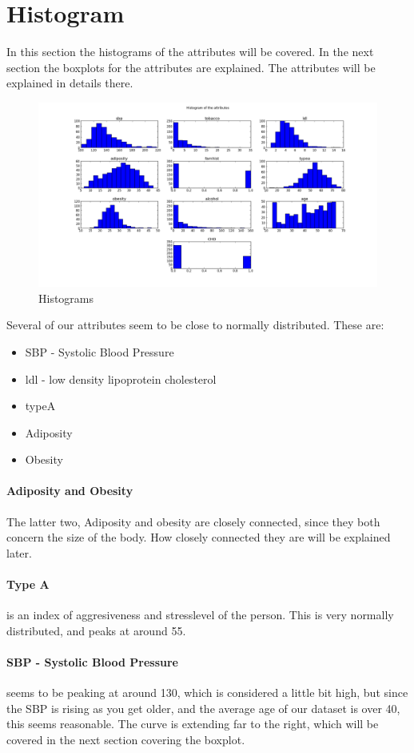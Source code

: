 \section{Histogram}
In this section the histograms of the attributes will be covered. In the next section the boxplots for the attributes are explained. The attributes will be explained in details there.
\begin{figure}[H]
\centering
\includegraphics[width=12cm, keepaspectratio=true]{pictures/histogram.png}
\caption{\footnotesize Histograms}
\label{histogram}
\end{figure}
Several of our attributes seem to be close to normally distributed. These are:
\begin{itemize}
\item SBP - Systolic Blood Pressure
\item ldl - low density lipoprotein cholesterol
\item typeA
\item Adiposity
\item Obesity
\end{itemize}
\paragraph{Adiposity and Obesity}
The latter two, Adiposity and obesity are closely connected, since they both concern the size of the body. How closely connected they are will be explained later.

\paragraph{Type A} is an index of aggresiveness and stresslevel of the person. This is very normally distributed, and peaks at around 55.

\paragraph{SBP - Systolic Blood Pressure} 	seems to be peaking at around 130, which is considered a little bit high, but since the SBP is rising as you get older, and the average age of our dataset is over 40, this seems reasonable. The curve is extending far to the right, which will be covered in the next section covering the boxplot.

